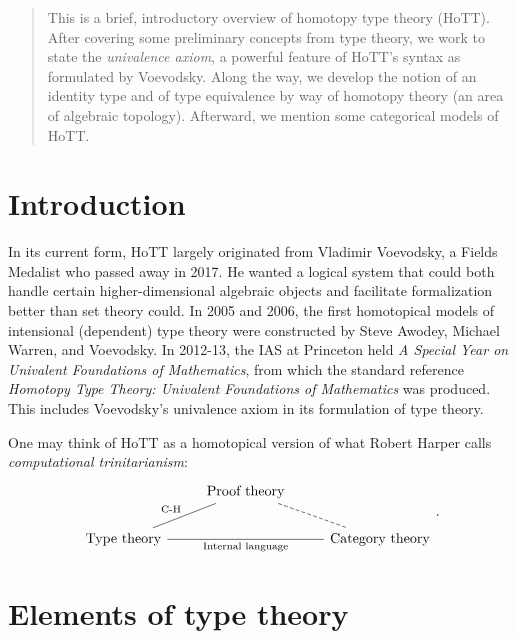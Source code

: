 \documentclass[10pt,letterpaper,cm]{nupset}
\theoremstyle{definition}
\theoremstyle{theorem}
\theoremstyle{remark}
\newcommand{\1}{\mathbf{1}}
\newcommand{\0}{\vec 0}
\begin{document}
\thispagestyle{empty}
\begin{abstract}
This is a brief, introductory overview of homotopy type theory (HoTT). After covering some preliminary concepts from type theory, we work to state the \textit{univalence axiom}, a powerful feature of HoTT's syntax as formulated by Voevodsky. Along the way, we develop the notion of an identity type and of type equivalence by way of homotopy theory (an area of algebraic topology). Afterward, we mention some categorical models of HoTT.
\end{abstract}



\tableofcontents
\newpage


\section*{Introduction}

In its current form, HoTT largely originated from Vladimir Voevodsky, a Fields Medalist who passed away in 2017. He wanted a logical system that could both handle certain higher-dimensional algebraic objects and facilitate formalization better than set theory could. In 2005 and 2006, the first homotopical models of intensional (dependent) type theory were constructed by Steve Awodey, Michael Warren, and Voevodsky. In 2012-13,  the IAS at Princeton held \textit{A Special Year on Univalent Foundations of Mathematics}, from which the standard reference \textit{Homotopy Type Theory: Univalent Foundations of Mathematics} was produced. This includes Voevodsky's univalence axiom in its formulation of type theory.

One may think of HoTT as a homotopical version of what Robert Harper calls \textit{computational trinitarianism}:
\[
\begin{tikzcd}
                                                  & \text{Proof theory} \arrow[ld, no head, "\text{C-H}"'] \arrow[rd, no head, dashed] &                                  \\
\text{Type theory} \arrow[rr, no head, "\text{Internal language}"'] &                                                                     & \text{Category theory}
\end{tikzcd}
.\]

\section{Elements of type theory}
\end{document}
